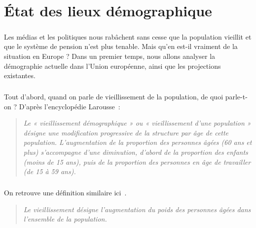 \chapter{État des lieux démographique}
\paragraph{}Les médias et les politiques nous rabâchent sans cesse que la population vieillit et que le système de pension n’est plus tenable. Mais qu’en est-il vraiment de la situation en Europe ?  Dans un premier temps, nous allons analyser la démographie actuelle dans l’Union européenne, ainsi que les projections existantes.

\paragraph{}Tout d'abord, quand on parle de vieillissement de la population, de quoi parle-t-on ? D’après l’encyclopédie Larousse~\citep{larousse}: 
\begin{quotation}
\textit{Le « vieillissement démographique » ou « vieillissement d'une population » désigne une modification progressive de la structure par âge de cette population. L'augmentation de la proportion des personnes âgées (60 ans et plus) s'accompagne d'une diminution, d'abord de la proportion des enfants (moins de 15 ans), puis de la proportion des personnes en âge de travailler (de 15 à 59 ans).}
\end{quotation}

\paragraph{}On retrouve une définition similaire ici~\citep{étudiant}.
\begin{quotation}
\textit{Le vieillissement désigne l’augmentation du poids des personnes âgées dans l’ensemble de la population.}
\end{quotation}

